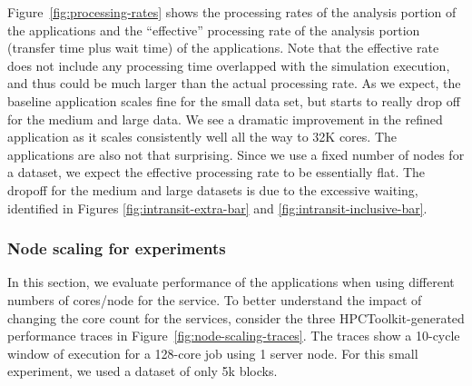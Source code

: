 Figure~\ref{fig:processing-rates} shows the processing rates of the
analysis portion of the \intransit applications and the ``effective''
processing rate of the analysis portion (transfer time plus wait time) of
the \intransit applications.  Note that the effective \intransit rate does
not include any processing time overlapped with the simulation execution,
and thus could be much larger than the actual processing rate.  As we
expect, the baseline application scales fine for the small data set, but
starts to really drop off for the medium and large data.  We see a dramatic
improvement in the \insitu refined application as it scales consistently
well all the way to 32K cores.  The \intransit applications are also not
that surprising.  Since we use a fixed number of nodes for a dataset, we
expect the effective processing rate to be essentially flat.  The dropoff
for the medium and large datasets is due to the excessive waiting,
identified in Figures \ref{fig:intransit-extra-bar} and
\ref{fig:intransit-inclusive-bar}.



\subsubsection{Node scaling for \intransit experiments}

In this section, we evaluate performance of the \intransit applications when
using different numbers of cores/node for the \intransit service.  To better
understand the impact of changing the core count for the services, consider the
three HPCToolkit-generated performance traces in
Figure~\ref{fig:node-scaling-traces}.  The traces show a 10-cycle window
of execution for a 128-core job using 1 server node. For this small experiment,
we used a dataset of only 5k blocks.

